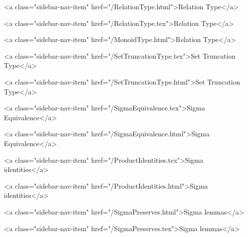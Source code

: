       
    
      
        
          <a class="sidebar-nav-item" href="/RelationType.html">Relation Type</a>
        
      
    
      
        
          <a class="sidebar-nav-item" href="/RelationType.tex">Relation Type</a>
        
      
    
      
        
          <a class="sidebar-nav-item" href="/MonoidType.html">Relation Type</a>
        
      
    
      
        
          <a class="sidebar-nav-item" href="/SetTruncationType.tex">Set Truncation Type</a>
        
      
    
      
        
          <a class="sidebar-nav-item" href="/SetTruncationType.html">Set Truncation Type</a>
        
      
    
      
        
          <a class="sidebar-nav-item" href="/SigmaEquivalence.tex">Sigma Equivalence</a>
        
      
    
      
        
          <a class="sidebar-nav-item" href="/SigmaEquivalence.html">Sigma Equivalence</a>
        
      
    
      
        
          <a class="sidebar-nav-item" href="/ProductIdentities.tex">Sigma identities</a>
        
      
    
      
        
          <a class="sidebar-nav-item" href="/ProductIdentities.html">Sigma identities</a>
        
      
    
      
        
          <a class="sidebar-nav-item" href="/SigmaPreserves.html">Sigma lemmas</a>
        
      
    
      
        
          <a class="sidebar-nav-item" href="/SigmaPreserves.tex">Sigma lemmas</a>
        
